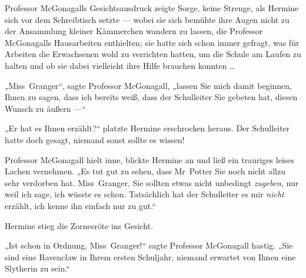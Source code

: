 Professor McGonagalls Gesichtsausdruck zeigte Sorge, keine Strenge, als Hermine sich vor dem Schreibtisch setzte — wobei sie sich bemühte ihre Augen nicht zu der Ansammlung kleiner Kämmerchen wandern zu lassen, die Professor McGonagalls Hausarbeiten enthielten; sie hatte sich schon immer gefragt, was für Arbeiten die Erwachsenen wohl zu verrichten hatten, um die Schule am Laufen zu halten und ob sie dabei vielleicht ihre Hilfe brauchen konnten …

„Miss~Granger“, sagte Professor McGonagall, „lassen Sie mich damit beginnen, Ihnen zu sagen, dass ich bereits weiß, dass der Schulleiter Sie gebeten hat, diesen Wunsch zu äußern —“

„Er hat es Ihnen erzählt?“ platzte Hermine erschrocken heraus. Der Schulleiter hatte doch gesagt, niemand sonst sollte es wissen!

Professor McGonagall hielt inne, blickte Hermine an und ließ ein trauriges leises Lachen vernehmen.
„Es tut gut zu sehen, dass Mr~Potter Sie noch nicht allzu sehr verdorben hat. Miss~Granger, Sie sollten etwas nicht unbedingt \emph{zugeben}, nur weil ich sage, ich wüsste es schon. Tatsächlich hat der Schulleiter es mir \emph{nicht} erzählt, ich kenne ihn einfach nur zu gut.“

Hermine stieg die Zornesröte ins Gesicht.

„Ist schon in Ordnung, Miss~Granger!“ sagte Professor McGonagall hastig.
„Sie sind eine Ravenclaw in Ihrem ersten Schuljahr, niemand erwartet von Ihnen eine Slytherin zu sein.“

